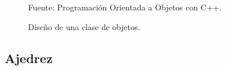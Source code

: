 \documentclass[conference]{IEEEtran}
\begin{document}
    \begin{figure}[ht]
        \caption{Diseño de una clase de objetos.}
        {{\footnotesize Fuente: Programación Orientada a Objetos con C++.}}
        \label{figdisenioclases}
    \end{figure}

    \subsection{Ajedrez}
    
\end{document}
